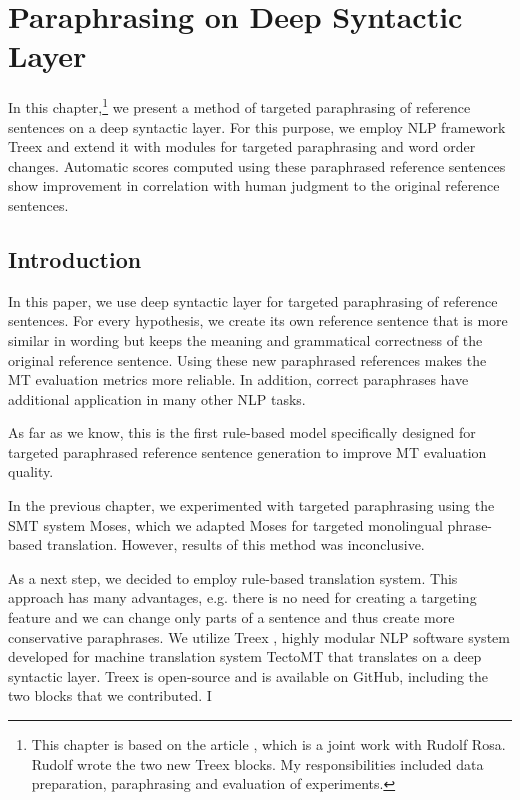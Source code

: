 \chapter{Paraphrasing on Deep Syntactic Layer}


In this chapter,\footnote{This chapter is based on the article \citep{barancikova-rosa-2015-targeted}, which is a joint work with Rudolf Rosa. 
Rudolf wrote the two new Treex blocks. My responsibilities included data preparation, paraphrasing and evaluation of experiments.} 
we present a method of targeted paraphrasing of reference sentences on a deep syntactic layer. 
For this purpose, we employ NLP framework Treex and extend it with modules for targeted paraphrasing and word order changes. 
Automatic scores computed using these paraphrased reference sentences show improvement in correlation with human judgment to the original reference sentences.


\section{Introduction}

In this paper, we use deep syntactic layer for targeted paraphrasing of 
reference sentences. For every hypothesis, we create its own reference sentence
that is more similar in wording but keeps the meaning and grammatical
correctness of the original reference sentence. Using these new paraphrased 
references makes the MT evaluation metrics more reliable. In addition, correct 
paraphrases have additional application in many other NLP tasks.

As far as we know, this is the first rule-based model specifically designed for
targeted paraphrased reference sentence generation to improve MT evaluation 
quality.

In the previous chapter, we experimented with targeted paraphrasing using the SMT system Moses,
which we adapted Moses for targeted monolingual phrase-based translation. However, results of this 
method was inconclusive.  

As a next step, we decided to employ rule-based translation system. 
This approach has many advantages, e.g. there is no need for creating a targeting feature and we can change only parts of a sentence and thus create more conservative paraphrases. 
We utilize Treex \cite{treex}, highly modular NLP software system developed for machine translation system TectoMT \cite{tectomt} that translates on a deep syntactic layer. 
Treex is open-source and is available on GitHub, including the two blocks that we contributed. I

